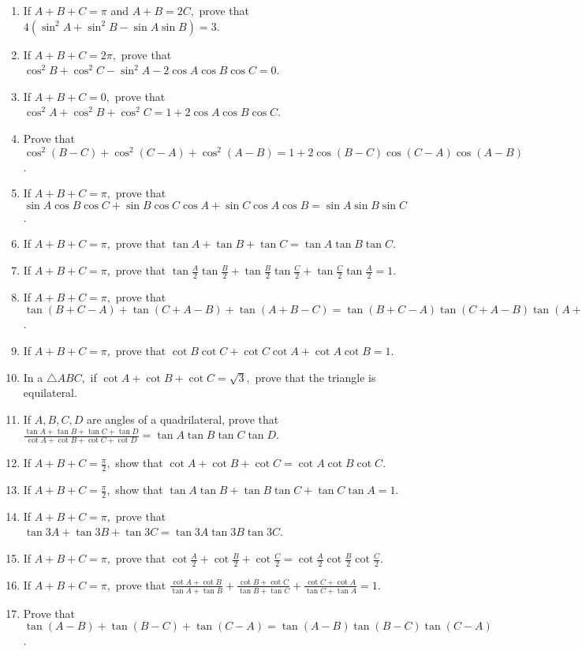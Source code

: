 \begin{enumerate}
\item If $A + B + C = \pi$ and $A + B = 2C,$ prove that $4(\sin^2A + \sin^2B - \sin A\sin B) = 3$.
\item If $A + B + C = 2\pi,$ prove that $\cos^2B + \cos^2C - \sin^2A - 2\cos A\cos B\cos C = 0$.
\item If $A + B + C = 0,$ prove that $\cos^2A + \cos^2B + \cos^2C = 1 + 2\cos A\cos B\cos C$.
\item Prove that $\cos^2(B - C) + \cos^2(C - A) + \cos^2(A - B) = 1 + 2\cos(B - C)\cos(C - A)\cos(A - B)$.
\item If $A + B + C = \pi,$ prove that $\sin A\cos B\cos C + \sin B\cos C\cos A + \sin C\cos A\cos B= \sin A\sin B\sin C$.
\item If $A + B + C = \pi,$ prove that $\tan A + \tan B + \tan C = \tan A\tan B\tan C$.
\item If $A + B + C = \pi,$ prove that $\tan\frac{A}{2}\tan\frac{B}{2} + \tan\frac{B}{2}\tan\frac{C}{2} +
  \tan\frac{C}{2}\tan\frac{A}{2} = 1$.
\item If $A + B + C = \pi,$ prove that $\tan(B + C - A) + \tan(C + A - B) + \tan(A + B - C) = \tan(B + C - A)\tan(C + A -
  B)\tan(A + B - C)$.
\item If $A + B + C = \pi,$ prove that $\cot B\cot C + \cot C\cot A + \cot A\cot B = 1$.
\item In a $\triangle ABC,$ if $\cot A + \cot B + \cot C = \sqrt{3},$ prove that the triangle is equilateral.
\item If $A, B, C, D$ are angles of a quadrilateral, prove that $\frac{\tan A + \tan B + \tan C + \tan D}{\cot A + \cot B
  + \cot C + \cot D} = \tan A\tan B\tan C\tan D$.
\item If $A + B + C = \frac{\pi}{2},$ show that $\cot A + \cot B + \cot C = \cot A\cot B\cot C$.
\item If $A + B + C = \frac{\pi}{2},$ show that $\tan A\tan B + \tan B\tan C + \tan C\tan A = 1$.
\item If $A + B + C = \pi,$ prove that $\tan 3A + \tan 3B + \tan 3C = \tan 3A\tan 3B\tan 3C$.
\item If $A + B + C = \pi,$ prove that $\cot \frac{A}{2} + \cot \frac{B}{2} + \cot \frac{C}{2} = \cot \frac{A}{2}\cot
  \frac{B}{2}\cot \frac{C}{2}$.
\item If $A + B + C = \pi,$ prove that $\frac{\cot A + \cot B}{\tan A + \tan B} + \frac{\cot B + \cot C}{\tan B + \tan C}
  + \frac{\cot C + \cot A}{\tan C + \tan A} = 1$.
\item Prove that $\tan(A - B) + \tan(B - C) + \tan(C - A) = \tan(A - B)\tan(B - C)\tan(C - A)$.

\end{enumerate}
